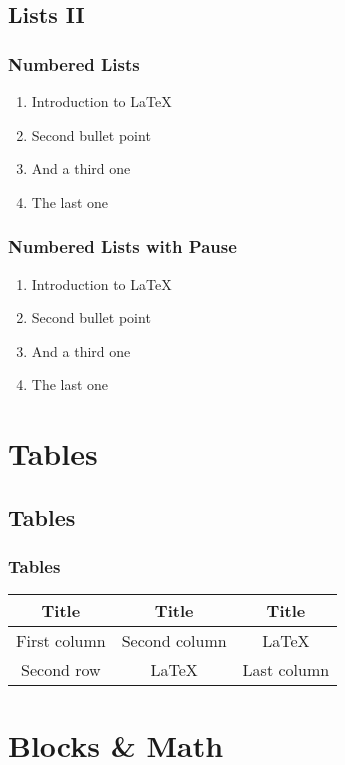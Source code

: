\documentclass{beamer}
\begin{document}
\subsection{Lists II}
\begin{frame}
   \frametitle{Numbered Lists}
   \begin{enumerate}
      \item Introduction to  \LaTeX  
      \item Second bullet point 
      \item And a third one
      \item The last one
   \end{enumerate}
\end{frame}



\begin{frame}
   \frametitle{Numbered Lists with Pause}
   \begin{enumerate}
      \item Introduction to  \LaTeX \pause 
      \item Second bullet point \pause 
      \item And a third one \pause 
      \item The last one
   \end{enumerate}
\end{frame}



\section{Tables} 
\subsection{Tables}
\begin{frame}
   \frametitle{Tables}
   \begin{tabular}{|c|c|c|}
      \hline
      \textbf{Title} & \textbf{Title} & \textbf{Title} \\
      \hline
      First column & Second column &  \LaTeX  \\
      \hline
      Second row & \LaTeX & Last column \\
      \hline
   \end{tabular}
\end{frame}



\section{Blocks \& Math}
\end{document}
